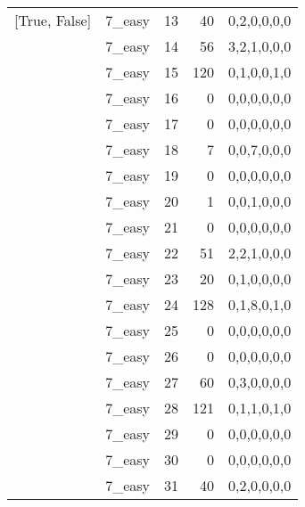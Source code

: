 \begin{tabular}{llrrl}
 [True, False]   & 7\_easy              &            13 &                    40 & 0,2,0,0,0,0   \\
 [True, False]   & 7\_easy              &            14 &                    56 & 3,2,1,0,0,0   \\
 [True, False]   & 7\_easy              &            15 &                   120 & 0,1,0,0,1,0   \\
 [True, False]   & 7\_easy              &            16 &                     0 & 0,0,0,0,0,0   \\
 [True, False]   & 7\_easy              &            17 &                     0 & 0,0,0,0,0,0   \\
 [True, False]   & 7\_easy              &            18 &                     7 & 0,0,7,0,0,0   \\
 [True, False]   & 7\_easy              &            19 &                     0 & 0,0,0,0,0,0   \\
 [True, False]   & 7\_easy              &            20 &                     1 & 0,0,1,0,0,0   \\
 [True, False]   & 7\_easy              &            21 &                     0 & 0,0,0,0,0,0   \\
 [True, False]   & 7\_easy              &            22 &                    51 & 2,2,1,0,0,0   \\
 [True, False]   & 7\_easy              &            23 &                    20 & 0,1,0,0,0,0   \\
 [True, False]   & 7\_easy              &            24 &                   128 & 0,1,8,0,1,0   \\
 [True, False]   & 7\_easy              &            25 &                     0 & 0,0,0,0,0,0   \\
 [True, False]   & 7\_easy              &            26 &                     0 & 0,0,0,0,0,0   \\
 [True, False]   & 7\_easy              &            27 &                    60 & 0,3,0,0,0,0   \\
 [True, False]   & 7\_easy              &            28 &                   121 & 0,1,1,0,1,0   \\
 [True, False]   & 7\_easy              &            29 &                     0 & 0,0,0,0,0,0   \\
 [True, False]   & 7\_easy              &            30 &                     0 & 0,0,0,0,0,0   \\
 [True, False]   & 7\_easy              &            31 &                    40 & 0,2,0,0,0,0   \\

\end{tabular}
